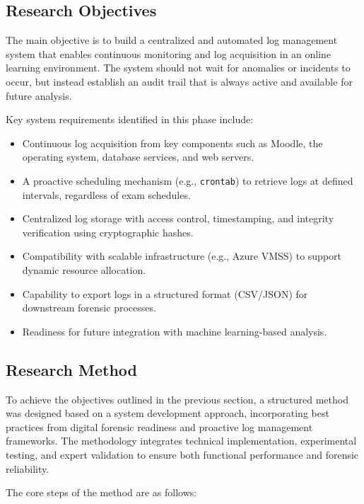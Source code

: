\subsection{Research Objectives}
The main objective is to build a centralized and automated log management system that enables continuous monitoring and log acquisition in an online learning environment. The system should not wait for anomalies or incidents to occur, but instead establish an audit trail that is always active and available for future analysis.

Key system requirements identified in this phase include:

\begin{itemize}
	\item Continuous log acquisition from key components such as Moodle, the operating system, database services, and web servers.
	\item A proactive scheduling mechanism (e.g., \texttt{crontab}) to retrieve logs at defined intervals, regardless of exam schedules.
	\item Centralized log storage with access control, timestamping, and integrity verification using cryptographic hashes.
	\item Compatibility with scalable infrastructure (e.g., Azure VMSS) to support dynamic resource allocation.
	\item Capability to export logs in a structured format (CSV/JSON) for downstream forensic processes.
	\item Readiness for future integration with machine learning-based analysis.
\end{itemize}


\subsection{Research Method}
To achieve the objectives outlined in the previous section, a structured method was designed based on a system development approach, incorporating best practices from digital forensic readiness and proactive log management frameworks. The methodology integrates technical implementation, experimental testing, and expert validation to ensure both functional performance and forensic reliability.

The core steps of the method are as follows:

